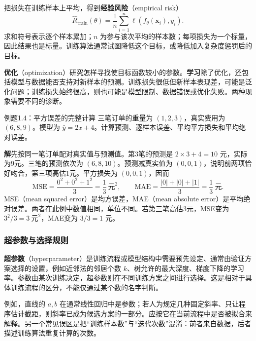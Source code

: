 \documentclass[UTF8,fontset=none,zihao=-4,a4paper]{ctexart}
\newcommand{\term}[1]{\textbf{#1}}
\newcommand{\sol}{\par\noindent\textbf{解}\quad}
\numberwithin{equation}{section}
\numberwithin{figure}{section}
\begin{document}
把损失在训练样本上平均，得到\term{经验风险}（empirical risk）
\begin{equation}
 \widehat R_{\mathrm{train}}(\theta)
 =\frac{1}{n}\sum_{i=1}^{n}\ell(f_\theta(\symbf{x}_i),y_i).
 \label{eq:empirical}
\end{equation}
求和符号表示逐个样本累加；$n$ 为参与该次平均的样本数；每项损失为一个标量，因此结果也是标量。训练算法通常试图降低这个目标，或降低加入复杂度惩罚后的目标。

\term{优化}（optimization）研究怎样寻找使目标函数较小的参数。\term{学习}除了优化，还包括模型与数据能否支持对新样本的预测。训练损失很低但新样本表现差，可能是泛化问题；训练损失始终很高，则也可能是模型限制、数据错误或优化失败。两种现象需要不同的诊断。

\begin{infobox}{例题1.4：平方误差的完整计算}
三笔订单的重量为 $(1,2,3)$，真实费用为 $(6,8,9)$。模型为 $\widehat y=2x+4$。计算预测、逐样本误差、平均平方损失和平均绝对误差。
\end{infobox}
\sol 先按同一笔订单配对真实值与预测值。第3笔的预测是 $2\times3+4=10$ 元，实际为9元。三笔的预测依次为 $(6,8,10)$。预测减真实值为 $(0,0,1)$，说明前两项恰好吻合，第三项高估1元。平方损失为 $(0,0,1)$，因而
\[
 \mathrm{MSE}=\frac{0^2+0^2+1^2}{3}=\frac13\ \text{元}^2,
 \qquad
 \mathrm{MAE}=\frac{|0|+|0|+|1|}{3}=\frac13\ \text{元}.
\]
MSE（mean squared error）是均方误差，MAE（mean absolute error）是平均绝对误差。两者在此例中数值相同，单位不同。若第三笔高估3元，MSE变为 $3^2/3=3\ \text{元}^2$，MAE变为 $3/3=1$ 元。

\subsubsection{超参数与选择规则}
\term{超参数}（hyperparameter）是训练流程或模型结构中需要预先设定、通常由验证方案选择的设置，例如近邻法的邻居个数 $k$、树允许的最大深度、梯度下降的学习率。参数由某次训练决定，超参数则在不同训练方案之间进行选择。这是相对于具体训练流程的区分，不能仅通过某个数的名字判断。

例如，直线的 $a,b$ 在通常线性回归中是参数；若人为规定几种固定斜率、只让程序估计截距，则斜率已成为候选方案的一部分。应按它在当前流程中是否被拟合来解释。另一个常见误区是把“训练样本数”与“迭代次数”混淆：前者来自数据，后者描述训练算法重复计算的次数。
\end{document}
